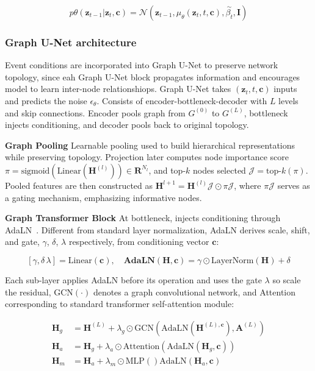 \documentclass[11pt]{article}
\begin{document}
\[
  p\theta(\textbf{z}_{t-1}|\textbf{z}_t, \textbf{c}) = \mathcal{N}(\textbf{z}_{t-1}, \mu_\theta(\textbf{z}_t, t, \textbf{c}), \overset{\sim}{\beta_t}, \textbf{I})
\]

\subsubsection{Graph U-Net architecture}

Event conditions are incorporated into Graph U-Net to preserve network topology, since eah Graph U-Net block propagates information and encourages model to learn inter-node relationshiops. Graph U-Net takes $(\textbf{z}_t, t, \textbf{c})$ inputs and predicts the noise $\epsilon_\theta$. Consists of encoder-bottleneck-decoder with $L$ levels and skip connections. Encoder pools graph from $G^{(0)}$ to $G^{(L)}$, bottleneck injects conditioning, and decoder pools back to original topology.

\textbf{Graph Pooling} Learnable pooling used to build hierarchical representations while preserving topology. Projection later computes node importance score $\pi = \text{sigmoid}(\text{Linear}(\textbf{H}^{(l)}))\in\mathbf{R}^{N_l}$, and top-$k$ nodes selected $\mathcal{J} = \text{top-}k(\pi)$. Pooled features are then constructed as $\textbf{H}^{l+1}=\textbf{H}^{(l)}\mathcal{J}\odot\pi\mathcal{J}$, where $\pi\mathcal{J}$ serves as a gating mechanism, emphasizing informative nodes. 

\textbf{Graph Transformer Block} At bottleneck, injects conditioning through AdaLN~\cite{ge2025t2s}. Different from standard layer normalization, AdaLN derives scale, shift, and gate, $\gamma$, $\delta$, $\lambda$ respectively, from conditioning vector $\textbf{c}$:

\[
  [\gamma, \delta\, \lambda] = \text{Linear}(\textbf{c}),\quad\textbf{AdaLN}(\textbf{H},\textbf{c})=\gamma\odot\text{LayerNorm}(\textbf{H})+\delta
\]

Each sub-layer applies AdaLN before its operation and uses the gate $\lambda$ so scale the residual, GCN$(\cdot)$ denotes a graph convolutional network, and Attention corresponding to standard transformer self-attention module:

\begin{align*}
      \textbf{H}_g &= \textbf{H}^{(L)}+\lambda_g\odot\text{GCN}(\text{AdaLN}(\textbf{H}^{(L), \textbf{c}}), \textbf{A}^{(L)})\\
      \textbf{H}_a &= \textbf{H}_g + \lambda_a\odot \text{Attention}(\text{AdaLN}(\textbf{H}_g, \textbf{c}))\\
      \textbf{H}_m &= \textbf{H}_a + \lambda_m\odot \text{MLP}()\text{AdaLN}(\textbf{H}_a, \textbf{c})
\end{align*}
\end{document}
